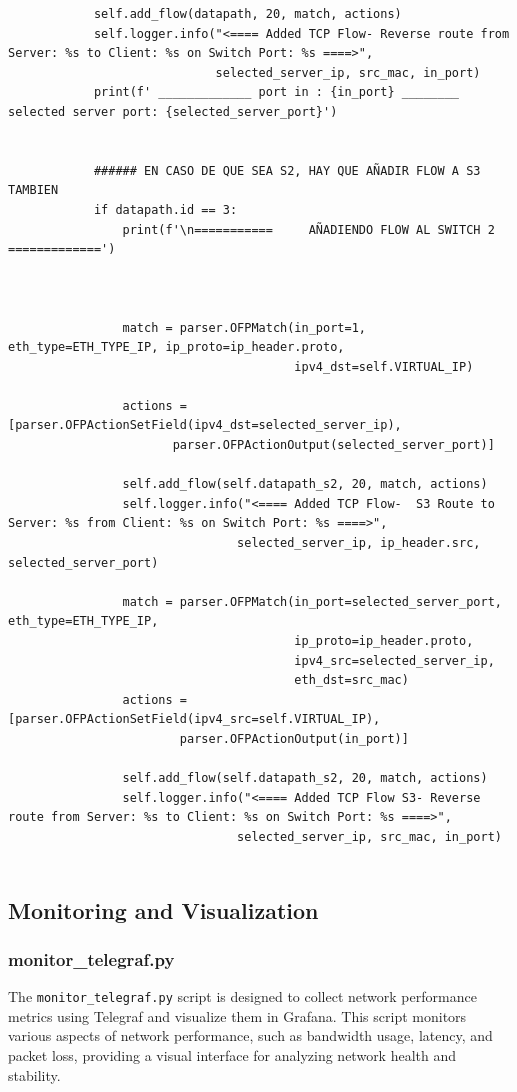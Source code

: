 \documentclass[a4paper,12pt]{article}
\begin{document}
\begin{verbatim}
            self.add_flow(datapath, 20, match, actions)
            self.logger.info("<==== Added TCP Flow- Reverse route from Server: %s to Client: %s on Switch Port: %s ====>",
                             selected_server_ip, src_mac, in_port)
            print(f' _____________ port in : {in_port} ________ selected server port: {selected_server_port}')
            
    
            ###### EN CASO DE QUE SEA S2, HAY QUE AÑADIR FLOW A S3 TAMBIEN
            if datapath.id == 3:
                print(f'\n===========     AÑADIENDO FLOW AL SWITCH 2      =============')
                
    
                
                match = parser.OFPMatch(in_port=1, eth_type=ETH_TYPE_IP, ip_proto=ip_header.proto,
                                        ipv4_dst=self.VIRTUAL_IP)
    
                actions = [parser.OFPActionSetField(ipv4_dst=selected_server_ip),
                       parser.OFPActionOutput(selected_server_port)]
    
                self.add_flow(self.datapath_s2, 20, match, actions)
                self.logger.info("<==== Added TCP Flow-  S3 Route to Server: %s from Client: %s on Switch Port: %s ====>",
                                selected_server_ip, ip_header.src, selected_server_port)
    
                match = parser.OFPMatch(in_port=selected_server_port, eth_type=ETH_TYPE_IP,
                                        ip_proto=ip_header.proto,
                                        ipv4_src=selected_server_ip,
                                        eth_dst=src_mac)
                actions = [parser.OFPActionSetField(ipv4_src=self.VIRTUAL_IP),
                        parser.OFPActionOutput(in_port)]
    
                self.add_flow(self.datapath_s2, 20, match, actions)
                self.logger.info("<==== Added TCP Flow S3- Reverse route from Server: %s to Client: %s on Switch Port: %s ====>",
                                selected_server_ip, src_mac, in_port)
    
\end{verbatim}

\subsection{Monitoring and Visualization}

\subsubsection{monitor\_telegraf.py}
The \texttt{monitor\_telegraf.py} script is designed to collect network performance metrics using Telegraf and visualize them in Grafana. This script monitors various aspects of network performance, such as bandwidth usage, latency, and packet loss, providing a visual interface for analyzing network health and stability.
\end{document}
